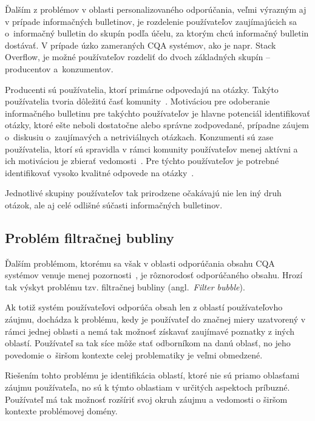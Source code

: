 Ďalším z problémov v oblasti personalizovaného odporúčania, veľmi výrazným aj v prípade informačných bulletinov,
je rozdelenie používateľov zaujímajúcich sa o~informačný bulletin do skupín podľa účelu, za ktorým chcú informačný bulletin dostávať.
V prípade úzko zameraných CQA systémov, ako je napr. Stack Overflow, je možné používateľov rozdeliť do dvoch základných
skupín -- producentov a~konzumentov.

Producenti sú používatelia, ktorí primárne odpovedajú na otázky. Takýto používatelia
tvoria dôležitú časť komunity~\cite{Anderson2012}. Motiváciou pre odoberanie informačného bulletinu pre takýchto používateľov
je hlavne potenciál identifikovať otázky, ktoré ešte neboli dostatočne alebo správne zodpovedané, prípadne záujem
o~diskusiu o~zaujímavých a netriviálnych otázkach. Konzumenti sú zase používatelia, ktorí sú spravidla v rámci komunity
používateľov menej aktívni a ich motiváciou je zbierať vedomosti~\cite{Anderson2012}. Pre týchto používateľov je potrebné
identifikovať vysoko kvalitné odpovede na otázky~\cite{Toba2014}.

Jednotlivé skupiny používateľov tak prirodzene očakávajú nie len iný druh otázok, ale aj celé odlišné súčasti informačných bulletinov.


\subsection{Problém filtračnej bubliny}\label{rec:filterbubble}

Ďalším problémom, ktorému sa však v oblasti odporúčania obsahu CQA systémov venuje menej pozornosti~\cite{Srba2016},
je rôznorodosť odporúčaného obsahu. Hrozí tak výskyt problému tzv. filtračnej bubliny (angl.~\emph{Filter bubble}).

Ak totiž systém používateľovi odporúča obsah len z oblastí používateľovho záujmu, dochádza k problému, kedy je používateľ
do značnej miery uzatvorený v rámci jednej oblasti a nemá tak možnosť získavať zaujímavé poznatky z iných oblastí.
Používateľ sa tak síce môže stať odborníkom na danú oblasť, no jeho povedomie o~širšom kontexte celej problematiky
je veľmi obmedzené.

Riešením tohto problému je identifikácia oblastí, ktoré nie sú priamo oblasťami záujmu používateľa, no sú k týmto
oblastiam v určitých aspektoch príbuzné. Používateľ má tak možnosť rozšíriť svoj okruh záujmu a vedomosti o širšom
kontexte problémovej domény.




